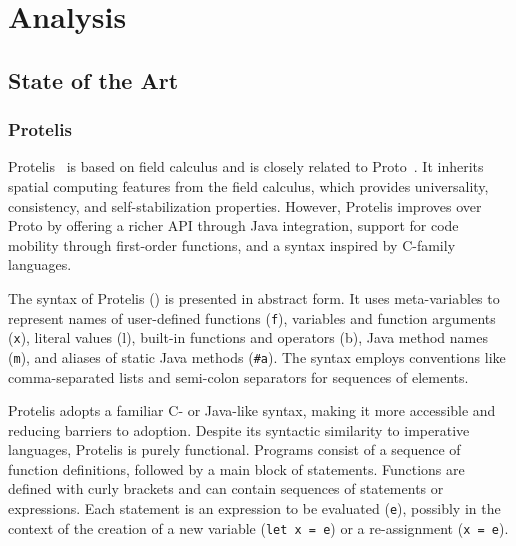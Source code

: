 
\chapter{Analysis}
\label{chap:analysis}
\section{State of the Art}

\subsection{Protelis}

Protelis~\cite{Pianini2015} is based on field calculus and is closely related to Proto~\cite{Beal2006}. It inherits spatial computing features from the field calculus, which provides universality, consistency, and self-stabilization properties. However, Protelis improves over Proto by offering a richer API through Java integration, support for code mobility through first-order functions, and a syntax inspired by C-family languages.

The syntax of Protelis () is presented in abstract form. It uses meta-variables to represent names of user-defined functions (\texttt{f}), variables and function arguments (\texttt{x}), literal values (l), built-in functions and operators (b), Java method names (\texttt{m}), and aliases of static Java methods (\texttt{\#a}). The syntax employs conventions like comma-separated lists and semi-colon separators for sequences of elements.

Protelis adopts a familiar C- or Java-like syntax, making it more accessible and reducing barriers to adoption. Despite its syntactic similarity to imperative languages, Protelis is purely functional. Programs consist of a sequence of function definitions, followed by a main block of statements. Functions are defined with curly brackets and can contain sequences of statements or expressions. Each statement is an expression to be evaluated (\texttt{e}), possibly in the context of the creation of a new variable (\texttt{let x = e}) or a re-assignment (\texttt{x = e}).

